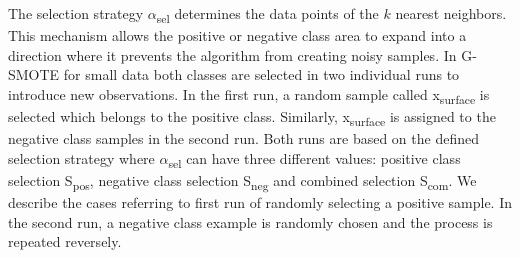 \documentclass[parskip=full]{scrartcl}
\begin{document}
The selection strategy $\alpha$\textsubscript{sel} determines the data points of the $\mathit{k}$ nearest neighbors. This mechanism allows the positive or negative class area to expand into a direction where it prevents the algorithm from creating noisy samples. In G-SMOTE for small data both classes are selected in two individual runs to introduce new observations. In the first run, a random sample called x\textsubscript{surface} is selected which belongs to the positive class. Similarly, x\textsubscript{surface} is assigned to the negative class samples in the second run. Both runs are based on the defined selection strategy where $\alpha$\textsubscript{sel} can have three different values: positive class selection S\textsubscript{pos}, negative class selection S\textsubscript{neg} and combined selection S\textsubscript{com}. We describe the cases referring to first run of randomly selecting a positive sample. In the second run, a negative class example is randomly chosen and the process is repeated reversely. 
\end{document}

